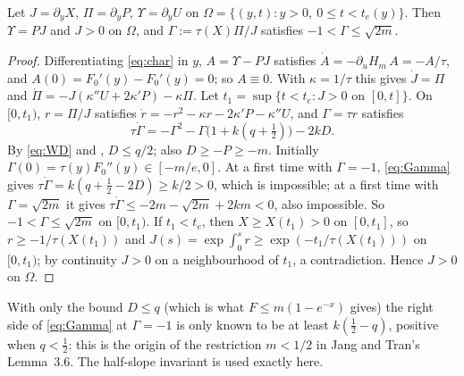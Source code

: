 \documentclass[11pt,a4paper]{report}
\begin{document}
\begin{lemma}\label{lem:barrier}
Let \(J=\partial_yX\), \(\Pi=\partial_yP\), \(\Upsilon=\partial_yU\) on
\(\Omega=\{(y,t):y>0,\ 0\le t<t_e(y)\}\). Then \(\Upsilon=PJ\) and \(J>0\) on \(\Omega\), and
\(\Gamma:=\tau(X)\Pi/J\) satisfies \(-1<\Gamma\le\sqrt{2m}\).
\end{lemma}
\begin{proof}
Differentiating \eqref{eq:char} in \(y\), \(A=\Upsilon-PJ\) satisfies \(\dot A=-\partial_uH_m\,A=-A/\tau\),
and \(A(0)=F_0'(y)-F_0'(y)=0\); so \(A\equiv0\). With \(\kappa=1/\tau\) this gives \(\dot J=\Pi\) and
\(\dot\Pi=-J(\kappa''U+2\kappa'P)-\kappa\Pi\). Let \(t_1=\sup\{t<t_e:J>0\text{ on }[0,t]\}\). On \([0,t_1)\),
\(r=\Pi/J\) satisfies \(\dot r=-r^2-\kappa r-2\kappa'P-\kappa''U\), and \(\Gamma=\tau r\) satisfies
\begin{equation}\label{eq:Gamma}
\tau\dot\Gamma=-\Gamma^2-\Gamma\bigl(1+k(q+\tfrac12)\bigr)-2kD .
\end{equation}
By \eqref{eq:WD} and , \(D\le q/2\); also \(D\ge-P\ge-m\). Initially
\(\Gamma(0)=\tau(y)F_0''(y)\in[-m/e,0]\). At a first time with \(\Gamma=-1\), \eqref{eq:Gamma} gives
\(\tau\dot\Gamma=k(q+\frac12-2D)\ge k/2>0\), which is impossible; at a first time with
\(\Gamma=\sqrt{2m}\) it gives \(\tau\dot\Gamma\le-2m-\sqrt{2m}+2km<0\), also impossible. So
\(-1<\Gamma\le\sqrt{2m}\) on \([0,t_1)\). If \(t_1<t_e\), then \(X\ge X(t_1)>0\) on \([0,t_1]\), so
\(r\ge-1/\tau(X(t_1))\) and \(J(s)=\exp\int_0^sr\ge\exp(-t_1/\tau(X(t_1)))\) on \([0,t_1)\); by continuity
\(J>0\) on a neighbourhood of \(t_1\), a contradiction. Hence \(J>0\) on \(\Omega\).
\end{proof}

With only the bound \(D\le q\) (which is what \(F\le m(1-e^{-x})\) gives) the right side of \eqref{eq:Gamma}
at \(\Gamma=-1\) is only known to be at least \(k(\frac12-q)\), positive when \(q<\frac12\): this is the
origin of the restriction \(m<1/2\) in Jang and Tran's Lemma~3.6. The half-slope invariant is used exactly here.
\end{document}
